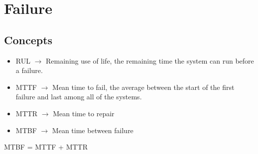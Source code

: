 \section{Failure}


\subsection{Concepts}
\begin{itemize}
	\item RUL $\rightarrow$ Remaining use of life, the remaining time the system can run before a failure.
	\item MTTF $\rightarrow$ Mean time to fail, the average between the start of the first failure and last among all of the systems.
	\item MTTR $\rightarrow$ Mean time to repair
	\item MTBF $\rightarrow$ Mean time between failure
\end{itemize}

MTBF = MTTF + MTTR
\\
